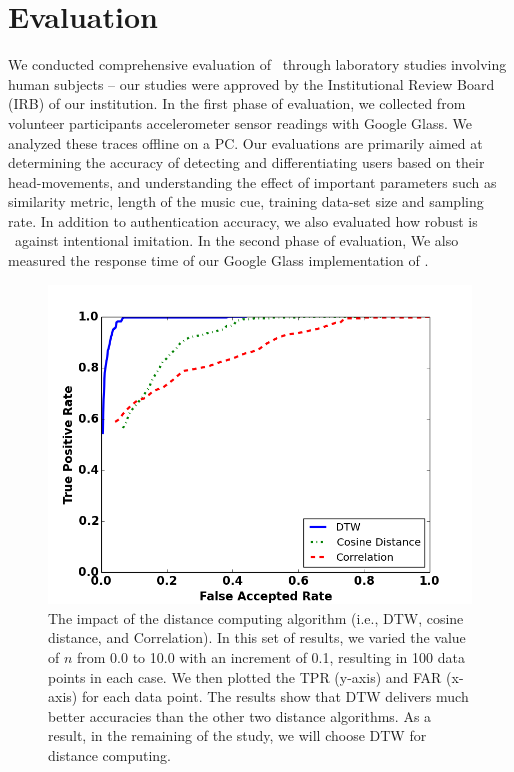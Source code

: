 \section{Evaluation}\label{sec:results}

We conducted comprehensive evaluation of \systemname~through laboratory studies involving
human subjects -- our studies were approved by the Institutional Review Board (IRB) of our
institution. In the first phase of evaluation, we collected from volunteer participants accelerometer sensor
readings with Google Glass. We analyzed these traces offline on a PC.
Our evaluations are primarily aimed at determining the accuracy of detecting
and differentiating users based on their head-movements, and understanding
the effect of important parameters such as similarity metric, length of the music cue, training
data-set size and sampling rate. In addition to authentication accuracy, we also evaluated how robust is \systemname~against intentional imitation.
In the second phase of evaluation, We also measured the response time of our Google
Glass implementation of \systemname.


\begin{figure}
\includegraphics[width=\columnwidth]{figure/roc_dtw_cos_cor.png}
\caption{\label{fig:roc_dtw_cos_cor} The impact of the distance computing algorithm (i.e., DTW, cosine distance, and Correlation). In this set of results, we varied the value of $n$ from 0.0 to 10.0 with an increment of 0.1, resulting in 100 data points in each case. We then plotted the TPR (y-axis) and FAR (x-axis) for each data point. The results show that DTW delivers much better accuracies than the other two distance algorithms. As a result, in the remaining of the study, we will choose DTW for distance computing.}
\end{figure}

